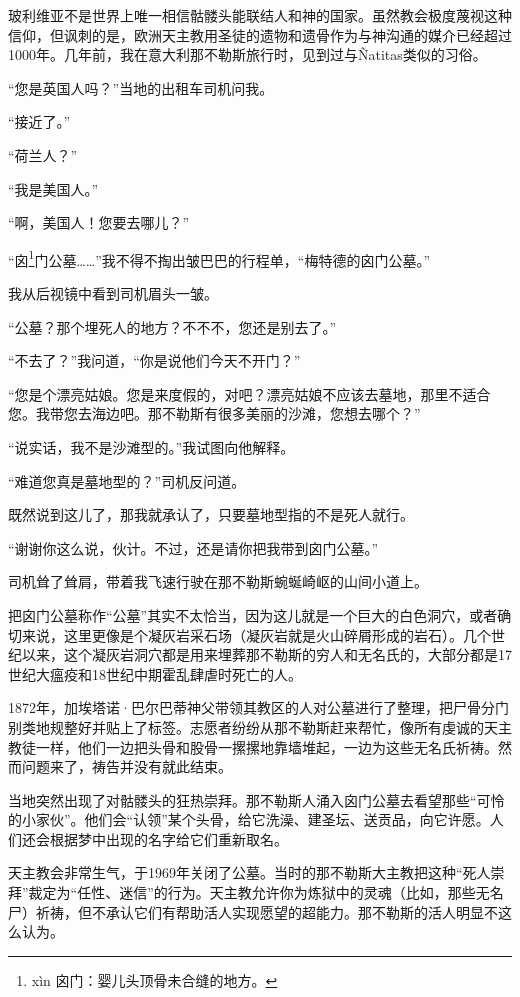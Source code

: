 \documentclass[12pt,oneside]{book}
\begin{document}
\begin{bookref}[frametitle={\cite{好好告别}}]
玻利维亚不是世界上唯一相信骷髅头能联结人和神的国家。虽然教会极度蔑视这种信仰，但讽刺的是，欧洲天主教用圣徒的遗物和遗骨作为与神沟通的媒介已经超过1000年。几年前，我在意大利那不勒斯旅行时，见到过与Ñatitas类似的习俗。

“您是英国人吗？”当地的出租车司机问我。

“接近了。”

“荷兰人？”

“我是美国人。”

“啊，美国人！您要去哪儿？”

“囟\footnote{xìn 囟门：婴儿头顶骨未合缝的地方。}门公墓……”我不得不掏出皱巴巴的行程单，“梅特德的囟门公墓。”

我从后视镜中看到司机眉头一皱。

“公墓？那个埋死人的地方？不不不，您还是别去了。”

“不去了？”我问道，“你是说他们今天不开门？”

“您是个漂亮姑娘。您是来度假的，对吧？漂亮姑娘不应该去墓地，那里不适合您。我带您去海边吧。那不勒斯有很多美丽的沙滩，您想去哪个？”

“说实话，我不是沙滩型的。”我试图向他解释。

“难道您真是墓地型的？”司机反问道。

既然说到这儿了，那我就承认了，只要墓地型指的不是死人就行。

“谢谢你这么说，伙计。不过，还是请你把我带到囟门公墓。”

司机耸了耸肩，带着我飞速行驶在那不勒斯蜿蜒崎岖的山间小道上。

把囟门公墓称作“公墓”其实不太恰当，因为这儿就是一个巨大的白色洞穴，或者确切来说，这里更像是个凝灰岩采石场（凝灰岩就是火山碎屑形成的岩石）。几个世纪以来，这个凝灰岩洞穴都是用来埋葬那不勒斯的穷人和无名氏的，大部分都是17世纪大瘟疫和18世纪中期霍乱肆虐时死亡的人。

1872年，加埃塔诺·巴尔巴蒂神父带领其教区的人对公墓进行了整理，把尸骨分门别类地规整好并贴上了标签。志愿者纷纷从那不勒斯赶来帮忙，像所有虔诚的天主教徒一样，他们一边把头骨和股骨一摞摞地靠墙堆起，一边为这些无名氏祈祷。然而问题来了，祷告并没有就此结束。

当地突然出现了对骷髅头的狂热崇拜。那不勒斯人涌入囟门公墓去看望那些“可怜的小家伙”。他们会“认领”某个头骨，给它洗澡、建圣坛、送贡品，向它许愿。人们还会根据梦中出现的名字给它们重新取名。

天主教会非常生气，于1969年关闭了公墓。当时的那不勒斯大主教把这种“死人崇拜”裁定为“任性、迷信”的行为。天主教允许你为炼狱中的灵魂（比如，那些无名尸）祈祷，但不承认它们有帮助活人实现愿望的超能力。那不勒斯的活人明显不这么认为。


\end{bookref}
\end{document}
